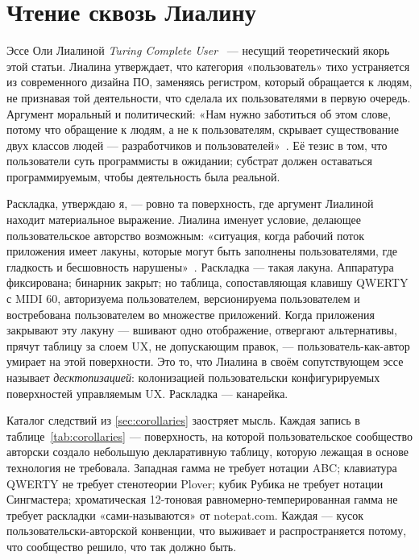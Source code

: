 \documentclass[10pt,letterpaper,twocolumn]{article}
\DeclareRobustCommand{\key}[1]{\tikz[baseline=(k.base)]{%
 \node[fill=keystroke, rounded corners=1.3pt, inner xsep=2.4pt,
    inner ysep=1.9pt, anchor=base, yshift=-1.2pt] at (0,0)
  {\footnotesize\ttfamily\bfseries\vphantom{A}\phantom{#1}};
 \node[draw=keystroke, line width=0.4pt, fill=keyfill,
    rounded corners=1.3pt, inner xsep=2.4pt, inner ysep=1.9pt,
    anchor=base] (k) at (0,0)
  {\footnotesize\ttfamily\bfseries\vphantom{A}#1};}}
\begin{document}
\section{Чтение сквозь Лиалину}
\label{sec:lialina}

Эссе Оли Лиалиной \emph{Turing Complete User}~\citep{lialina2012turing,lialina2021turingbook} --- несущий теоретический якорь этой статьи. Лиалина утверждает, что категория «пользователь» тихо устраняется из современного дизайна ПО, заменяясь регистром, который обращается к людям, не признавая той деятельности, что сделала их пользователями в первую очередь. Аргумент моральный и политический: «Нам нужно заботиться об этом слове, потому что обращение к людям, а не к пользователям, скрывает существование двух классов людей --- разработчиков и пользователей»~\citep{lialina2012turing}. Её тезис в том, что пользователи суть программисты в ожидании; субстрат должен оставаться программируемым, чтобы деятельность была реальной.

Раскладка, утверждаю я, --- ровно та поверхность, где аргумент Лиалиной находит материальное выражение. Лиалина именует условие, делающее пользовательское авторство возможным: «ситуация, когда рабочий поток приложения имеет лакуны, которые могут быть заполнены пользователями, где гладкость и бесшовность нарушены»~\citep{lialina2012turing}. Раскладка --- такая лакуна. Аппаратура фиксирована; бинарник закрыт; но таблица, сопоставляющая клавишу QWERTY \key{A} с MIDI 60, авторизуема пользователем, версионируема пользователем и востребована пользователем во множестве приложений. Когда приложения закрывают эту лакуну --- вшивают одно отображение, отвергают альтернативы, прячут таблицу за слоем UX, не допускающим правок, --- пользователь-как-автор умирает на этой поверхности. Это то, что Лиалина в своём сопутствующем эссе~\citep{lialina2018rich} называет \emph{десктопизацией}: колонизацией пользовательски конфигурируемых поверхностей управляемым UX. Раскладка --- канарейка.

Каталог следствий из \textsection\ref{sec:corollaries} заостряет мысль. Каждая запись в таблице~\ref{tab:corollaries} --- поверхность, на которой пользовательское сообщество авторски создало небольшую декларативную таблицу, которую лежащая в основе технология не требовала. Западная гамма не требует нотации ABC; клавиатура QWERTY не требует стенотеории Plover; кубик Рубика не требует нотации Сингмастера; хроматическая 12-тоновая равномерно-темперированная гамма не требует раскладки «сами-называются» от notepat.com. Каждая --- кусок пользовательски-авторской конвенции, что выживает и распространяется потому, что сообщество решило, что так должно быть.
\end{document}
